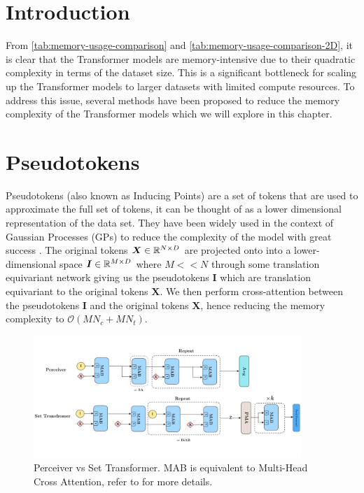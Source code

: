 \documentclass[../../main.tex]{subfiles}
\begin{document}
\section{Introduction}


From \autoref{tab:memory-usage-comparison} and \autoref{tab:memory-usage-comparison-2D}, it is clear that the Transformer models are memory-intensive due to their quadratic complexity in terms of the dataset size. This is a significant bottleneck for scaling up the Transformer models to larger datasets with limited compute resources. To address this issue, several methods have been proposed to reduce the memory complexity of the Transformer models which we will explore in this chapter.

\section{Pseudotokens}

Pseudotokens (also known as Inducing Points) are a set of tokens that are used to approximate the full set of tokens, it can be thought of as a lower dimensional representation of the data set. They have been widely used in the context of Gaussian Processes (GPs) to reduce the complexity of the model with great success \cite{hensman2013gaussian}. The original tokens $\bm{X} \in \mathbb{R}^{N \times D}$ are projected onto into a lower-dimensional space $\bm{I} \in \mathbb{R}^{M \times D}$ where $M << N$ through some translation equivariant network \cite{anonymous2024translationequivariant} giving us the pseudotokens $\bm{I}$ which are translation equivariant to the original tokens $\bm{X}$. We then perform cross-attention between the pseudotokens $\bm{I}$ and the original tokens $\bm{X}$, hence reducing the memory complexity to $\mathcal{O}(MN_c + MN_t)$. 



\begin{figure}[H]
    \centering
    \includegraphics[width=0.9\textwidth]{fig/set-transformer.png}
    \caption{Perceiver vs Set Transformer. MAB is equivalent to Multi-Head Cross Attention, refer to \cite{jaegle2021perceiver, lee2019set} for more details.}
    \label{fig:set-transformer}
\end{figure}
\end{document}
